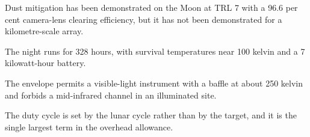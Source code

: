 \begin{keytakeaways}
\item Dust mitigation has been demonstrated on the Moon at TRL 7 with a
96.6 per cent camera-lens clearing efficiency, but it has not been
demonstrated for a kilometre-scale array.
\item The night runs for 328 hours, with survival temperatures near 100
kelvin and a 7 kilowatt-hour battery.
\item The envelope permits a visible-light instrument with a baffle at about
250 kelvin and forbids a mid-infrared channel in an illuminated site.
\item The duty cycle is set by the lunar cycle rather than by the target,
and it is the single largest term in the overhead allowance.
\end{keytakeaways}
